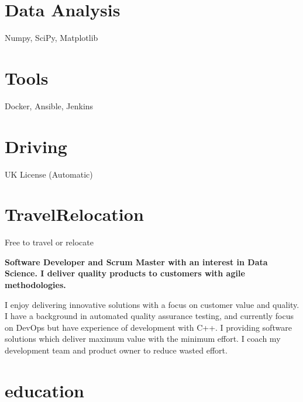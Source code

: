\documentclass[]{cv-style}          %
\begin{document}
\begin{aside}
\section{Data Analysis}
Numpy, SciPy, Matplotlib
\section{Tools}
Docker, Ansible, Jenkins
\section{Driving}UK License (Automatic)
\section{Travel\/Relocation}Free to travel or relocate
\end{aside}
\textbf{Software Developer and Scrum Master with an interest in Data Science. I deliver quality products to customers with agile methodologies.}\par
I enjoy delivering innovative solutions with a focus on customer value and quality. I have a background in automated quality assurance
testing, and currently focus on DevOps but have experience of development with C++. I providing software solutions which deliver maximum value
with the minimum effort. I coach my development team and product owner to reduce wasted effort.


\section{education}
\end{document}

